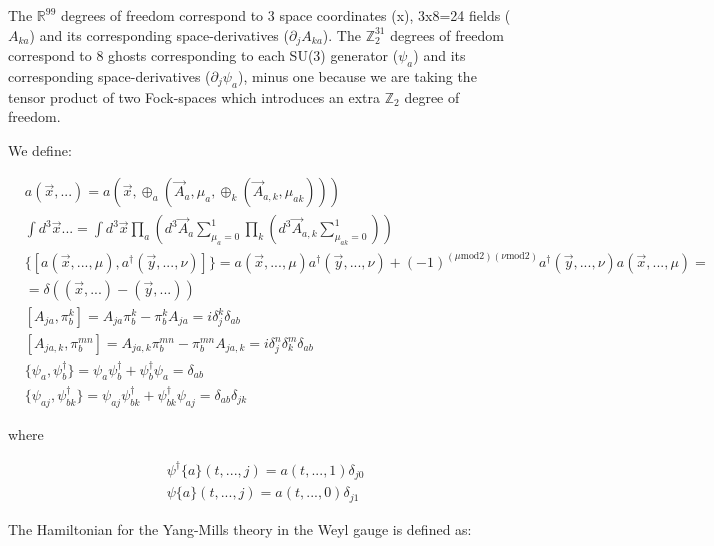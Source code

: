 \documentclass[11pt]{book}
\begin{document}
The \(\mathbb{R}^{99}\) degrees of freedom correspond to 3 space
coordinates (x), 3x8=24 fields (\(A_{k a}\)) and its corresponding
space-derivatives (\(\partial_{j}A_{k a}\)). The \(\mathbb{Z}_2^{31}\)
degrees of freedom correspond to 8 ghosts corresponding to each SU(3)
generator (\(\psi_{a}\)) and its corresponding space-derivatives
(\(\partial_{j}\psi_{a}\)), minus one because we are taking the tensor
product of two Fock-spaces which introduces an extra \(\mathbb{Z}_2\)
degree of freedom.

We define:

\begin{equation}\begin{aligned}
    & a(\vec{x}, ...) = a(\vec{x},\oplus_{a}(\vec{A}_{a},\mu_{a},\oplus_{k}(\vec{A}_{a,k},\mu_{a k})))\\
    & \int d^3\vec{x} ... = \int d^3\vec{x}\prod_{a}(d^3\vec{A}_{a}\sum_{\mu_{a}=0}^1\prod_{k}(d^3 \vec{A}_{a,k}\sum_{\mu_{a k}=0}^1)) \\
 &\{[a(\vec{x}, ..., \mu),a^\dagger(\vec{y}, ...,\nu)]\}=a(\vec{x}, ...,\mu) a^\dagger(\vec{y}, ...,\nu)+(-1)^{(\mu \mathrm{mod} 2)(\nu \mathrm{mod} 2)}a^\dagger(\vec{y}, ...,\nu) a(\vec{x}, ...,\mu)=\\
&=\delta((\vec{x},...)-(\vec{y},...))\\
    &[A_{j a},\pi^{k}_{b}]=A_{j a}\pi^{k}_{b}-\pi^{k}_{b} A_{j a}= i\delta^{k}_{j} \delta_{a b}\\
    &[ A_{j a,k},\pi^{m n}_{b}]=A_{j a,k}\pi^{m n}_{b}-\pi^{m n}_{b} A_{j a,k}= i\delta^{n}_{j}\delta^{m}_{k}\delta_{a b}\\
 &\{\psi_{a},\psi^\dagger_{b}\}=\psi_{a} \psi^\dagger_{b}+\psi^\dagger_{b}\psi_{a}=\delta_{a b}\\
&\{\psi_{a j},\psi^\dagger_{b k}\}=\psi_{a j} \psi^\dagger_{b k}+\psi^\dagger_{b k}\psi_{a j}=\delta_{a b}\delta_{j k}
\end{aligned}\end{equation}

where

\begin{equation}\begin{aligned}
 & \psi^\dagger\{a\}(t, ...,j)= a(t, ...,1) \delta_{j 0}\\
& \psi\{a\}(t, ...,j)=  a(t, ...,0) \delta_{j 1}
\end{aligned}\end{equation}

The Hamiltonian for the Yang-Mills theory in the Weyl gauge is defined
as:
\end{document}
